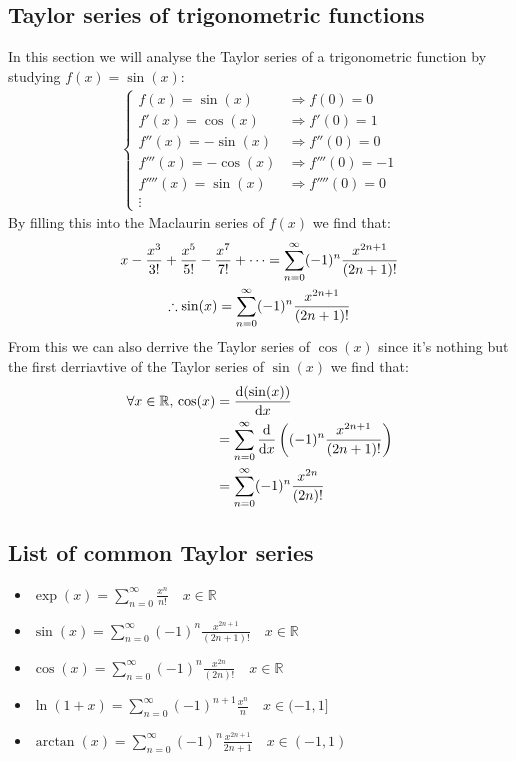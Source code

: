 \documentclass[11pt, a4paper]{article}
\newcommand*{\R}{\ensuremath{\mathbb{R}}}
\renewcommand*{\d}{\text{d}}
\numberwithin{equation}{section}
\numberwithin{figure}{section}
\begin{document}
\subsection{Taylor series of trigonometric functions}
In this section we will analyse the Taylor series of a trigonometric function by studying $f(x) = \sin(x)$:
\begin{align}
  \begin{cases}
    f(x) = \sin(x) &\Rightarrow f(0) = 0\\
    f'(x) = \cos(x) &\Rightarrow f'(0) = 1\\
    f''(x) = -\sin(x) &\Rightarrow f''(0) = 0\\
    f'''(x) = -\cos(x) &\Rightarrow f'''(0) = -1\\
    f''''(x) = \sin(x) &\Rightarrow f''''(0) = 0\\
    \vdots
  \end{cases}
\end{align}
By filling this into the Maclaurin series of $f(x)$ we find that:
\begin{gather}
  x - \frac{x^3}{3!} + \frac{x^5}{5!} - \frac{x^7}{7!} + \cdots = \sum_{n=0}^{\infty} (-1)^n \frac{x^{2n+1}}{(2n+1)!}\notag\\
  \therefore \sin(x) = \sum_{n=0}^{\infty} (-1)^n\frac{x^{2n+1}}{(2n+1)!}
\end{gather}
From this we can also derrive the Taylor series of $\cos(x)$ since it's nothing but the first derriavtive of the Taylor series of $\sin(x)$ we find that:
\begin{align}
  \forall x \in \R,\, \cos(x) &= \frac{\d(\sin(x))}{\d x} \notag\\
                              &= \sum_{n=0}^{\infty} \frac{\d}{\d x} \left( (-1)^n\frac{x^{2n+1}}{(2n+1)!} \right) \notag\\
                              &= \sum_{n=0}^{\infty} (-1)^n\frac{x^{2n}}{(2n)!}
\end{align}



\subsection{List of common Taylor series}
\begin{itemize}
  \item [] $\exp(x) = \sum_{n=0}^{\infty} \frac{x^n}{n!} \quad x\in\R$
  \item [] $\sin(x) = \sum_{n=0}^{\infty} (-1)^n \frac{x^{2n+1}}{(2n+1)!} \quad x\in\R$
  \item [] $\cos(x) = \sum_{n=0}^{\infty} (-1)^n \frac{x^{2n}}{(2n)!} \quad x\in\R$
  \item [] $\ln(1+x) = \sum_{n=0}^{\infty} (-1)^{n+1} \frac{x^n}{n} \quad x \in (-1, 1]$
  \item [] $\arctan(x) = \sum_{n=0}^{\infty} (-1)^n \frac{x^{2n+1}}{2n+1} \quad x\in(-1, 1)$
\end{itemize}
\end{document}
